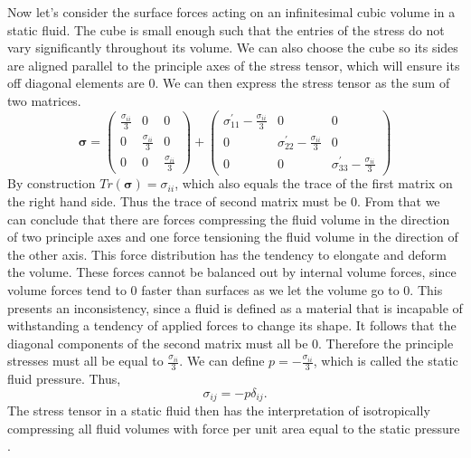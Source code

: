 \documentclass[12pt, letter]{report}
\begin{document}
Now let's consider the surface forces acting on an infinitesimal cubic volume in a static fluid. The cube is small enough such that the entries of the stress do not vary significantly throughout its volume. We can also choose the cube so its sides are aligned parallel to the principle axes of the stress tensor, which will ensure its off diagonal elements are $0$. We can then express the stress tensor as the sum of two matrices.
\begin{equation}
\boldsymbol{\sigma}=
\begin{pmatrix}
\frac{\sigma_{ii}}{3} & 0 & 0 \\
0 & \frac{\sigma_{ii}}{3} & 0 \\
0 & 0 & \frac{\sigma_{ii}}{3}
\end{pmatrix}
+
\begin{pmatrix}
\sigma^{'}_{11}-\frac{\sigma_{ii}}{3} & 0 & 0 \\
0 & \sigma^{'}_{22}-\frac{\sigma_{ii}}{3} & 0 \\
0 & 0 & \sigma^{'}_{33}-\frac{\sigma_{ii}}{3}
\end{pmatrix}
\end{equation}
By construction $Tr(\boldsymbol{\sigma})=\sigma_{ii}$, which also equals the trace of the first matrix on the right hand side. Thus the trace of second matrix must be $0$. From that we can conclude that there are forces compressing the fluid volume in the direction of two principle axes and one force tensioning the fluid volume in the direction of the other axis. This force distribution has the tendency to elongate and deform the volume. These forces cannot be balanced out by internal volume forces, since volume forces tend to $0$ faster than surfaces as we let the volume go to $0$. This presents an inconsistency, since a fluid is defined as a material that is incapable of withstanding a tendency of applied forces to change its shape. It follows that the diagonal components of the second matrix must all be $0$. Therefore the principle stresses must all be equal to $\frac{\sigma_{ii}}{3}$. We can define $p=-\frac{\sigma_{ii}}{3}$, which is called the static fluid pressure. Thus,
\begin{equation}
\sigma_{ij} = -p \delta_{ij}.
\end{equation}
The stress tensor in a static fluid then has the interpretation of isotropically compressing all fluid volumes with force per unit area equal to the static pressure \cite{Batchelor2000}.
\end{document}
